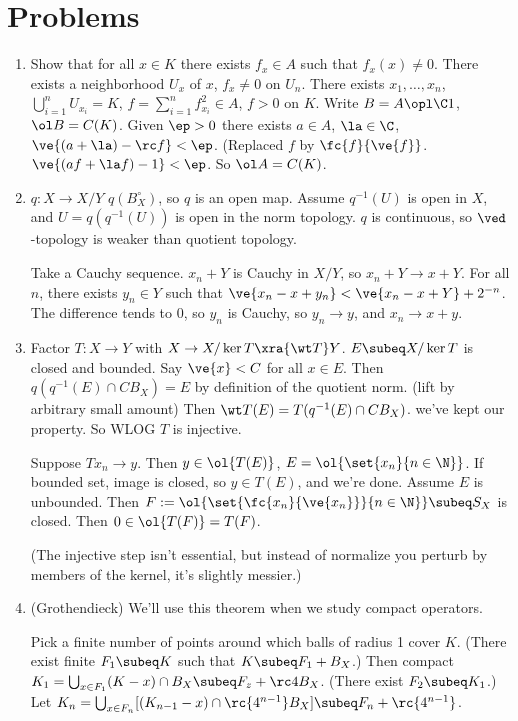 \chapter{Problems}

\begin{enumerate}
\item
Show that for all $x\in K$ there exists $f_x\in A$ such that $f_x(x)\ne 0$. There exists a neighborhood $U_x$ of $x$, $f_x\ne 0$ on $U_n$. There exists $x_1,\ldots, x_n$, $\bigcup_{i=1}^n U_{x_i}=K$, $f=\sum_{i=1}^n f_{x_i}^2\in A$, $f>0$ on $K$. Write $B=A\opl \C 1$, $\ol B=C(K)$. Given $\ep>0$ there exists $a\in A$, $\la\in \C$, $\ve{(a+\la)-\rc f}<\ep$. (Replaced $f$ by $\fc{f}{\ve{f}}$. $\ve{(af+\la f)-1}<\ep$. So $\ol A=C(K)$.
\item
$q:X\to X/Y$ $q(B_{X}^{\circ})$, so $q$ is an open map.
Assume $q^{-1}(U)$ is open in $X$, and $U=q(q^{-1}(U))$ is open in the norm topology. $q$ is continuous, so $\ved$-topology is weaker than quotient topology.

Take a Cauchy sequence. $x_n+Y$ is Cauchy in $X/Y$, so $x_n+Y\to x+Y$. For all $n$, there exists $y_n\in Y$ such that $\ve{x_n-x+y_n}<\ve{x_n-x+Y}+2^{-n}$. The difference tends to 0, so $y_n$ is Cauchy, so $y_n\to y$, and $x_n\to x+y$.

\item
Factor $T:X\to Y$ with $X\to X/\ker T\xra{\wt T} Y$. $E\subeq X/\ker T$ is closed and bounded. Say $\ve{x}<C$ for all $x\in E$. Then $q(q^{-1}(E)\cap CB_X)=E$ by definition of the quotient norm. (lift by arbitrary small amount)
Then $\wt T(E)=T(q^{-1}(E)\cap CB_X)$. 
we've kept our property. So WLOG $T$ is injective.

Suppose $Tx_n\to y$. Then $y\in \ol{T(E)}$, $E=\ol{\set{x_n}{n\in \N}}$. If bounded set, image is closed, so $y\in T(E)$, and we're done. Assume $E$ is unbounded. Then $F:=\ol{\set{\fc{x_n}{\ve{x_n}}}{n\in \N}}\subeq S_X$ is closed. Then $0\in \ol{T(F)}=T(F)$.

(The injective step isn't essential, but instead of normalize you perturb by members of the kernel, it's slightly messier.)
\item 
(Grothendieck) We'll use this theorem when we study compact operators.

Pick a finite number of points around which balls of radius 1 cover $K$. 
(There exist finite $F_1\subeq K$ such that $K\subeq F_1+B_X$.) 
Then compact $K_1=\bigcup_{x\in F_1} (K-x)\cap B_X\subeq F_z+\rc 4B_X$. (There exist $F_2\subeq K_1$.)
Let $K_n=\bigcup_{x\in F_n}[(K_{n-1}-x)\cap \rc{4^{n-1}}B_X]\subeq F_n+\rc{4^{n-1}}$.


\end{enumerate}
